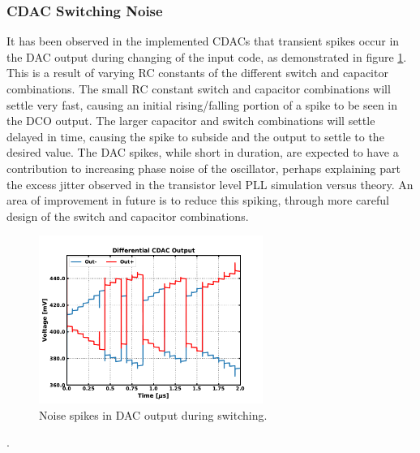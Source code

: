 	\subsubsection{CDAC Switching Noise}	
		It has been observed in the implemented CDACs that transient spikes occur in the DAC output during changing of the input code, as demonstrated in figure \ref{fig:dac_sw_noise}. This is a result of varying RC constants of the different switch and capacitor combinations.  The small RC constant switch and capacitor combinations will settle very fast, causing an initial rising/falling portion of a spike to be seen in the DCO output. The larger capacitor and switch combinations will settle delayed in time, causing the spike to subside and the output to settle to the desired value. The DAC spikes, while short in duration, are expected to have a contribution to increasing phase noise of the oscillator, perhaps explaining part the excess jitter observed in the transistor level PLL simulation versus theory. An area of improvement in future is to reduce this spiking, through more careful design of the switch and capacitor combinations. 
		\begin{figure}[htb!]
	        \centering
	        \includegraphics[width=0.65\textwidth, angle=0]{./figs/design/cdac_sw_noise}
		    \caption{Noise spikes in DAC output during switching.}
		    \label{fig:dac_sw_noise}
		\end{figure}
\FloatBarrier
{\color{white}.}
